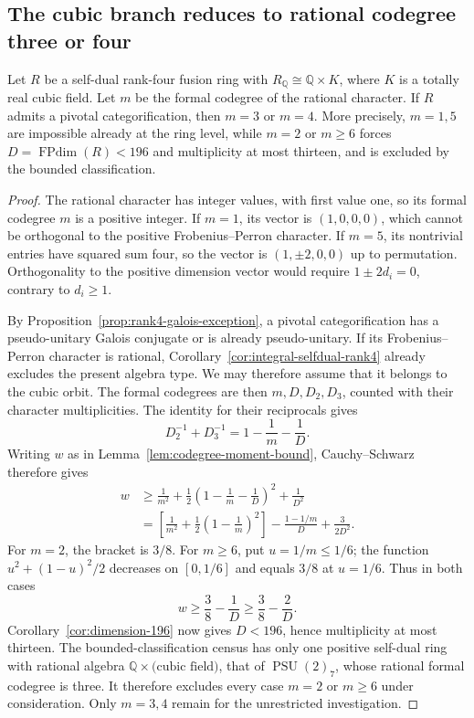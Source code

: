 \subsection{The cubic branch reduces to rational codegree three or four}
\label{sec:unbounded-cubic-codegrees}
\begin{proposition}\label{prop:cubic-rational-codegree-bound}
Let $R$ be a self-dual rank-four fusion ring with
$R_{\mathbb Q}\cong\mathbb Q\times K$, where $K$ is a totally real cubic
field. Let $m$ be the formal codegree of the rational character. If $R$
admits a pivotal categorification, then $m=3$ or $m=4$.
More precisely, $m=1,5$ are impossible already at the ring level, while
$m=2$ or $m\geq6$ forces $D=\operatorname{FPdim}(R)<196$ and multiplicity
at most thirteen, and is excluded by the bounded classification.
\end{proposition}
\begin{proof}
The rational character has integer values, with first value one, so its
formal codegree $m$ is a positive integer. If $m=1$, its vector is
$(1,0,0,0)$, which cannot be orthogonal to the positive Frobenius--Perron
character. If $m=5$, its nontrivial entries have squared sum four, so the
vector is $(1,\pm2,0,0)$ up to permutation. Orthogonality to the positive
dimension vector would require $1\pm2d_i=0$, contrary to $d_i\geq1$.

By Proposition~\ref{prop:rank4-galois-exception}, a pivotal categorification
has a pseudo-unitary Galois conjugate or is already pseudo-unitary. If its
Frobenius--Perron character is rational, Corollary~\ref{cor:integral-selfdual-rank4}
already excludes the present algebra type. We may therefore assume that
it belongs to the cubic orbit. The formal codegrees are then
$m,D,D_2,D_3$, counted with their character multiplicities. The identity
for their reciprocals gives
\[
 D_2^{-1}+D_3^{-1}=1-\frac1m-\frac1D.
\]
Writing $w$ as in Lemma~\ref{lem:codegree-moment-bound}, Cauchy--Schwarz
therefore gives
\begin{align*}
 w&\geq\frac1{m^2}+
 \frac12\left(1-\frac1m-\frac1D\right)^2+\frac1{D^2}\\
 &=\left[\frac1{m^2}+\frac12\left(1-\frac1m\right)^2\right]
   -\frac{1-1/m}{D}+\frac3{2D^2}.
\end{align*}
For $m=2$, the bracket is $3/8$. For $m\geq6$, put $u=1/m\leq1/6$;
the function $u^2+(1-u)^2/2$ decreases on $[0,1/6]$ and equals $3/8$
at $u=1/6$. Thus in both cases
\[
 w\geq\frac38-\frac1D\geq\frac38-\frac2D.
\]
Corollary~\ref{cor:dimension-196} now gives
$D<196$, hence multiplicity at most thirteen. The bounded-classification
census has only one positive self-dual ring with rational algebra
$\mathbb Q\times\text{(cubic field)}$, that of
$\operatorname{PSU}(2)_7$, whose rational formal codegree is three.
It therefore excludes every case $m=2$ or $m\geq6$ under consideration.
Only $m=3,4$ remain for the unrestricted investigation.
\end{proof}
